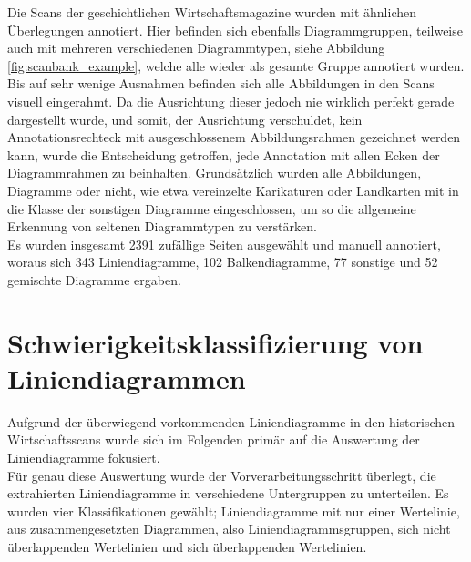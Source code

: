 Die Scans der geschichtlichen Wirtschaftsmagazine wurden mit ähnlichen Überlegungen annotiert. Hier befinden sich ebenfalls Diagrammgruppen, teilweise auch mit mehreren verschiedenen Diagrammtypen, siehe Abbildung \ref{fig:scanbank_example}, welche alle wieder als gesamte Gruppe annotiert wurden. Bis auf sehr wenige Ausnahmen befinden sich alle Abbildungen in den Scans visuell eingerahmt. Da die Ausrichtung dieser jedoch nie wirklich perfekt gerade dargestellt wurde, und somit, der Ausrichtung verschuldet, kein Annotationsrechteck mit ausgeschlossenem Abbildungsrahmen gezeichnet werden kann, wurde die Entscheidung getroffen, jede Annotation mit allen Ecken der Diagrammrahmen zu beinhalten. Grundsätzlich wurden alle Abbildungen, Diagramme oder nicht, wie etwa vereinzelte Karikaturen oder Landkarten mit in die Klasse der sonstigen Diagramme eingeschlossen, um so die allgemeine Erkennung von seltenen Diagrammtypen zu verstärken.
\\
Es wurden insgesamt 2391 zufällige Seiten ausgewählt und manuell annotiert, woraus sich 343 Liniendiagramme, 102 Balkendiagramme, 77 sonstige und 52 gemischte Diagramme ergaben.

\clearpage
\section{Schwierigkeitsklassifizierung von Liniendiagrammen}
\label{ch:linebank}

Aufgrund der überwiegend vorkommenden Liniendiagramme in den historischen Wirtschaftsscans wurde sich im Folgenden primär auf die Auswertung der Liniendiagramme fokusiert.
\\
Für genau diese Auswertung wurde der Vorverarbeitungsschritt überlegt, die extrahierten Liniendiagramme in verschiedene Untergruppen zu unterteilen. Es wurden vier Klassifikationen gewählt; Liniendiagramme mit nur einer Wertelinie, aus zusammengesetzten Diagrammen, also Liniendiagrammsgruppen, sich nicht überlappenden Wertelinien und sich überlappenden Wertelinien.

